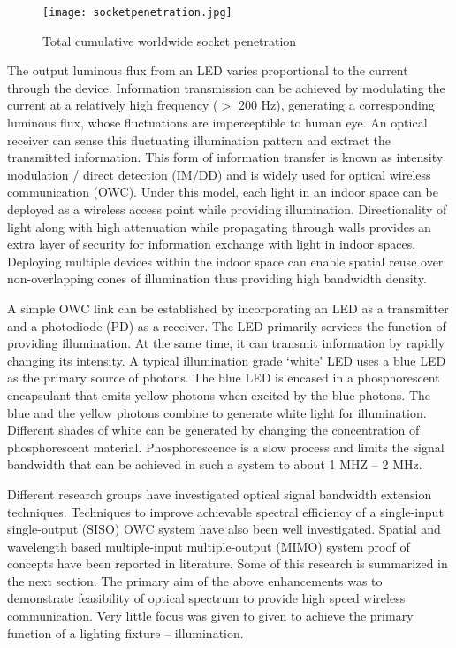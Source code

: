 \begin{figure}[!t]
	\centering
		\texttt{[image: socketpenetration.jpg]}
	\caption[Total cumulative worldwide socket penetration]{Total cumulative worldwide socket penetration \cite{bar11a}}
	\label{fig:socketpenetration}
\end{figure}

The output luminous flux from an LED varies proportional to the current through the device. Information transmission can be achieved by modulating the current at a relatively high frequency ($>$ 200 Hz), generating a corresponding luminous flux, whose fluctuations are imperceptible to human eye. An optical receiver can sense this fluctuating illumination pattern and extract the transmitted information. This form of information transfer is known as intensity modulation / direct detection (IM/DD) and is widely used for optical wireless communication (OWC). Under this model, each light in an indoor space can be deployed as a wireless access point while providing illumination. Directionality of light along with high attenuation while propagating through walls provides an extra layer of security for information exchange with light in indoor spaces. Deploying multiple devices within the indoor space can enable spatial reuse over non-overlapping cones of illumination thus providing high bandwidth density.

A simple OWC link can be established by incorporating an LED as a transmitter and a photodiode (PD) as a receiver. The LED primarily services the function of providing illumination. At the same time, it can transmit information by rapidly changing its intensity. A typical illumination grade `white' LED uses a blue LED as the primary source of photons. The blue LED is encased in a phosphorescent encapsulant that emits yellow photons when excited by the blue photons. The blue and the yellow photons combine to generate white light for illumination. Different shades of white can be generated by changing the concentration of phosphorescent material. Phosphorescence is a slow process and limits the signal bandwidth that can be achieved in such a system to about 1 MHZ -- 2 MHz.

Different research groups have investigated optical signal bandwidth extension techniques. Techniques to improve achievable spectral efficiency of a single-input single-output (SISO) OWC system have also been well investigated. Spatial and wavelength based multiple-input multiple-output (MIMO) system proof of concepts have been reported in literature. Some of this research is summarized in the next section. The primary aim of the above enhancements was to demonstrate feasibility of optical spectrum to provide high speed wireless communication. Very little focus was given to given to achieve the primary function of a lighting fixture -- illumination. 

